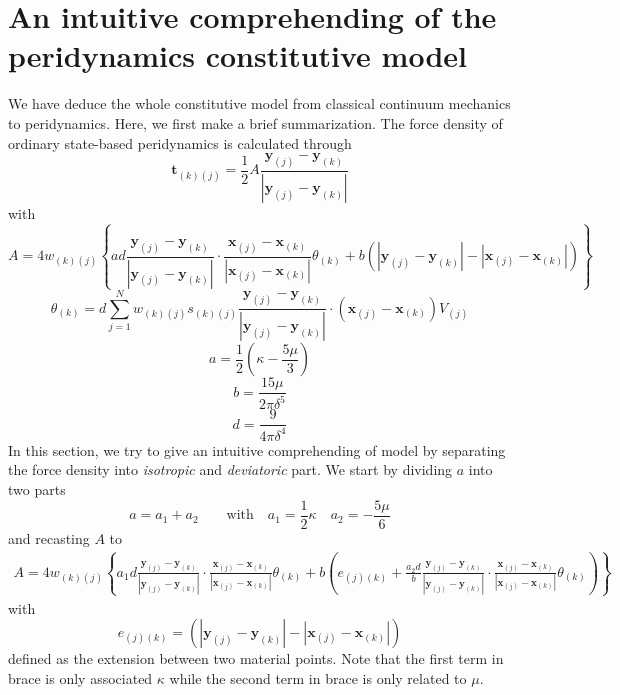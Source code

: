 \documentclass[a4paper,11pt,CJK]{paper}
\newcommand{\bfxj}{\textbf{x}_{(j)}}
\newcommand{\bfyj}{\textbf{y}_{(j)}}
\newcommand{\bfxk}{\textbf{x}_{(k)}}
\newcommand{\bfyk}{\textbf{y}_{(k)}}
\newcommand{\wkj}{w_{(k)(j)}}
\newcommand{\skj}{s_{(k)(j)}}
\newcommand{\tkj}{\textbf{t}_{(k)(j)}}
\newcommand{\thetak}{\theta_{(k)}}
\begin{document}
\section{An intuitive comprehending of the peridynamics constitutive model}
We have deduce the whole constitutive model from classical continuum mechanics to peridynamics. Here, we first make a brief summarization.
The force density of ordinary state-based peridynamics is calculated through
\begin{equation}
\tkj = \frac{1}{2}A\frac{\bfyj - \bfyk}{|\bfyj - \bfyk|}
\end{equation}
with
\begin{equation}
A = 4\wkj\left\{ad\frac{\bfyj-\bfyk}{|\bfyj-\bfyk|}\cdot\frac{\bfxj-\bfxk}{|\bfxj-\bfxk|}\thetak
   +b\left(|\bfyj - \bfyk| - |\bfxj - \bfxk|\right) \right\}
\end{equation}
\begin{equation}
\thetak = d\sum_{j=1}^{N}\wkj\skj\frac{\bfyj - \bfyk}{|\bfyj - \bfyk|}\cdot(\bfxj-\bfxk)V_{(j)}
\end{equation}
\begin{equation}
a = \frac{1}{2}(\kappa - \frac{5\mu}{3})
\end{equation}
\begin{equation}
b = \frac{15\mu}{2\pi\delta^5}
\end{equation}
\begin{equation}
d = \frac{9}{4\pi\delta^4}
\end{equation}
In this section, we try to give an intuitive comprehending of model by separating the force density into \textit{isotropic} and \textit{deviatoric} part.
We start by dividing $a$ into two parts
\begin{equation}
a = a_1 + a_2 \qquad \mathrm{with}\quad a_1 = \frac{1}{2}\kappa \quad a_2 = -\frac{5\mu}{6}
\end{equation}
and recasting $A$ to
\begin{equation}
\begin{aligned}
A =4\wkj\left\{a_1d\frac{\bfyj-\bfyk}{|\bfyj-\bfyk|}\cdot\frac{\bfxj-\bfxk}{|\bfxj-\bfxk|}\thetak
   +b\left(e_{(j)(k)} + \frac{a_2d}{b}\frac{\bfyj-\bfyk}{|\bfyj-\bfyk|}\cdot\frac{\bfxj-\bfxk}{|\bfxj-\bfxk|}\thetak\right) \right\}
\end{aligned}
\end{equation}
with
\begin{equation}
e_{(j)(k)} = (|\bfyj - \bfyk| - |\bfxj - \bfxk|)
\end{equation}
defined as the extension between two material points. Note that the first term in brace is only associated $\kappa$ while the second term in brace is only related to $\mu$.
\end{document}
